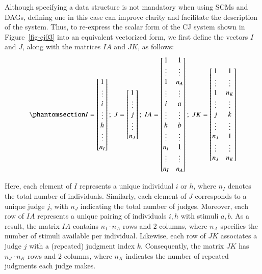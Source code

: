 \documentclass[
  authoryear,
  review,
  1p]{elsarticle}
\begin{document}
Although specifying a data structure is not mandatory when using SCMs
and DAGs, defining one in this case can improve clarity and facilitate
the description of the system. Thus, to re-express the scalar form of
the CJ system shown in Figure~\ref{fig-cj03} into an equivalent
vectorized form, we first define the vectors \(I\) and \(J\), along with
the matrices \(IA\) and \(JK\), as follows:
\begin{equation}\phantomsection\label{eq-mat11}{
I = \begin{bmatrix}
1 \\
\vdots \\
i \\
\vdots \\
h \\
\vdots \\
n_{I}
\end{bmatrix} ; \;
J = \begin{bmatrix}
1 \\
\vdots \\
j \\
\vdots \\
n_{J}
\end{bmatrix} ; \;
IA = \begin{bmatrix}
1 & 1 \\
\vdots & \vdots \\
1 & n_{A} \\
\vdots & \vdots \\
i & a \\
\vdots & \vdots \\
h & b \\
\vdots & \vdots \\
n_{I} & 1 \\
\vdots & \vdots \\
n_{I} & n_{A}
\end{bmatrix} ; \;
JK = \begin{bmatrix}
1 & 1 \\
\vdots & \vdots \\
1 & n_{K} \\
\vdots & \vdots \\
j & k \\
\vdots & \vdots \\
n_{J} & 1 \\
\vdots & \vdots \\
n_{J} & n_{K}
\end{bmatrix}
}\end{equation}

Here, each element of \(I\) represents a unique individual \(i\) or
\(h\), where \(n_{I}\) denotes the total number of individuals.
Similarly, each element of \(J\) corresponds to a unique judge \(j\),
with \(n_{J}\) indicating the total number of judges. Moreover, each row
of \(IA\) represents a unique pairing of individuals \(i, h\) with
stimuli \(a, b\). As a result, the matrix \(IA\) contains
\(n_{I} \cdot n_{A}\) rows and \(2\) columns, where \(n_{A}\) specifies
the number of stimuli available per individual. Likewise, each row of
\(JK\) associates a judge \(j\) with a (repeated) judgment index \(k\).
Consequently, the matrix \(JK\) has \(n_{J} \cdot n_{K}\) rows and \(2\)
columns, where \(n_{K}\) indicates the number of repeated judgments each
judge makes.
\end{document}
